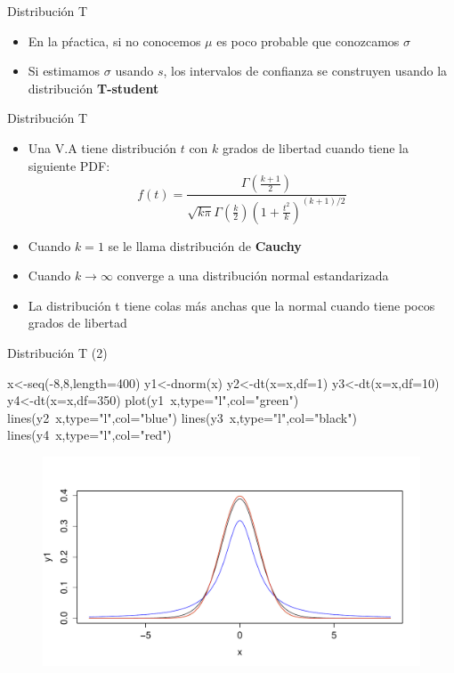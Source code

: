\documentclass[handout]{beamer}
\begin{document}
\begin{frame}{Distribución T}
\scriptsize{
\begin{itemize}
 \item En la pŕactica, si no conocemos $\mu$ es poco probable que conozcamos $\sigma$
 \item Si estimamos $\sigma$ usando $s$, los intervalos de confianza se construyen usando la distribución \textbf{T-student}
\end{itemize}

\begin{block}{Distribución T}
\begin{itemize}
 \item Una V.A tiene distribución $t$ con $k$ grados de libertad cuando tiene la siguiente PDF:
\begin{displaymath}
 f(t)=\frac{\Gamma(\frac{k+1}{2})}{\sqrt{k\pi}\Gamma(\frac k2)(1+\frac{t^2}{k})^{(k+1)/2}}
\end{displaymath}
\item Cuando $k=1$ se le llama distribución de \textbf{Cauchy}
\item Cuando $k\rightarrow \infty$ converge a una distribución normal estandarizada
 \item La distribución t tiene colas más anchas que la normal cuando tiene pocos grados de libertad


\end{itemize}

 
\end{block}




} 
\end{frame}

\begin{frame}[fragile]{Distribución T (2)}
 \scriptsize{



\begin{verbatim*}
x<-seq(-8,8,length=400)
y1<-dnorm(x)
y2<-dt(x=x,df=1)
y3<-dt(x=x,df=10)
y4<-dt(x=x,df=350)
plot(y1~x,type="l",col="green")
lines(y2~x,type="l",col="blue")
lines(y3~x,type="l",col="black")
lines(y4~x,type="l",col="red")

\end{verbatim*}

 \begin{figure}[h!]
	\centering
	\includegraphics[scale=0.3]{pics/tstudent.pdf}
\end{figure}


}
\end{frame}
\end{document}
